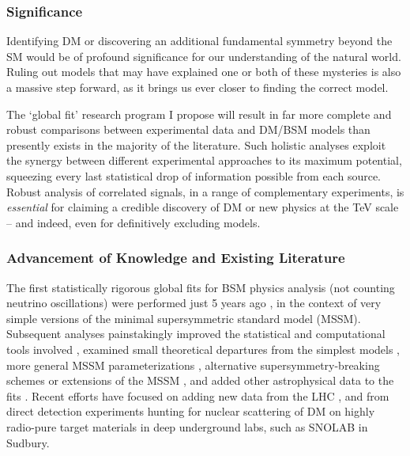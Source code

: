 \documentclass[10pt,oneside,twocolumn,a4paper]{article}
\begin{document}
\subsubsection*{Significance}

Identifying DM or discovering an additional fundamental symmetry beyond the SM would be of profound significance for our understanding of the natural world.  Ruling out models that may have explained one or both of these mysteries is also a massive step forward, as it brings us ever closer to finding the correct model.

The `global fit' research program I propose will result in far more complete and robust comparisons between experimental data and DM/BSM models than presently exists in the majority of the literature.  Such holistic analyses exploit the synergy between different experimental approaches to its maximum potential, squeezing every last statistical drop of information possible from each source.  Robust analysis of correlated signals, in a range of complementary experiments, is \textit{essential} for claiming a credible discovery of DM or new physics at the TeV scale -- and indeed, even for definitively excluding models.

\subsubsection*{Advancement of Knowledge and Existing Literature}

The first statistically rigorous global fits for BSM physics analysis (not counting neutrino oscillations) were performed just 5 years ago \cite{Allanach06,Ruiz06}, in the context of very simple versions of the minimal supersymmetric standard model (MSSM).  Subsequent analyses painstakingly improved the statistical and computational tools involved \cite{Trotta08,Akrami09,SBspike,Akrami11coverage,SBcoverage}, examined small theoretical departures from the simplest models \cite{Buchmueller08,Roszkowski09b}, more general MSSM parameterizations \cite{AbdusSalam09a}, alternative supersymmetry-breaking schemes \cite{AbdusSalam09b} or extensions of the MSSM \cite{Balazs08}, and added other astrophysical data to the fits \cite{Scott09c,Ripken11}.  Recent efforts have focused on adding new data from the LHC \cite{Allanach11a,Allanach11b,Mastercode11}, and from direct detection experiments \cite{MastercodeXENON100,SuperbayesXENON100} hunting for nuclear scattering of DM on highly radio-pure target materials in deep underground labs, such as SNOLAB in Sudbury.
\end{document}
